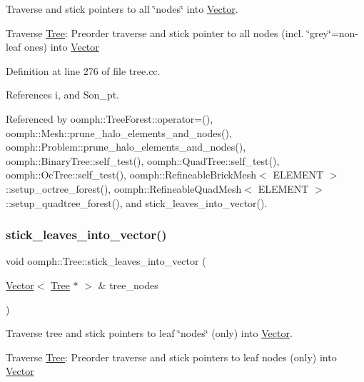 Traverse and stick pointers to all \char`\"{}nodes\char`\"{} into \hyperlink{classoomph_1_1Vector}{Vector}. 

Traverse \hyperlink{classoomph_1_1Tree}{Tree}\+: Preorder traverse and stick pointer to all nodes (incl. \char`\"{}grey\char`\"{}=non-\/leaf ones) into \hyperlink{classoomph_1_1Vector}{Vector} 

Definition at line 276 of file tree.\+cc.



References i, and Son\+\_\+pt.



Referenced by oomph\+::\+Tree\+Forest\+::operator=(), oomph\+::\+Mesh\+::prune\+\_\+halo\+\_\+elements\+\_\+and\+\_\+nodes(), oomph\+::\+Problem\+::prune\+\_\+halo\+\_\+elements\+\_\+and\+\_\+nodes(), oomph\+::\+Binary\+Tree\+::self\+\_\+test(), oomph\+::\+Quad\+Tree\+::self\+\_\+test(), oomph\+::\+Oc\+Tree\+::self\+\_\+test(), oomph\+::\+Refineable\+Brick\+Mesh$<$ E\+L\+E\+M\+E\+N\+T $>$\+::setup\+\_\+octree\+\_\+forest(), oomph\+::\+Refineable\+Quad\+Mesh$<$ E\+L\+E\+M\+E\+N\+T $>$\+::setup\+\_\+quadtree\+\_\+forest(), and stick\+\_\+leaves\+\_\+into\+\_\+vector().

\mbox{\label{classoomph_1_1Tree_accfbeb9178ce92a8a51e3a15293a86d1}} 
\subsubsection{\texorpdfstring{stick\+\_\+leaves\+\_\+into\+\_\+vector()}{stick\_leaves\_into\_vector()}}
{\footnotesize\ttfamily void oomph\+::\+Tree\+::stick\+\_\+leaves\+\_\+into\+\_\+vector (\begin{DoxyParamCaption}\item[{\hyperlink{classoomph_1_1Vector}{Vector}$<$ \hyperlink{classoomph_1_1Tree}{Tree} $\ast$ $>$ \&}]{tree\+\_\+nodes }\end{DoxyParamCaption})}



Traverse tree and stick pointers to leaf \char`\"{}nodes\char`\"{} (only) into \hyperlink{classoomph_1_1Vector}{Vector}. 

Traverse \hyperlink{classoomph_1_1Tree}{Tree}\+: Preorder traverse and stick pointers to leaf nodes (only) into \hyperlink{classoomph_1_1Vector}{Vector} 

